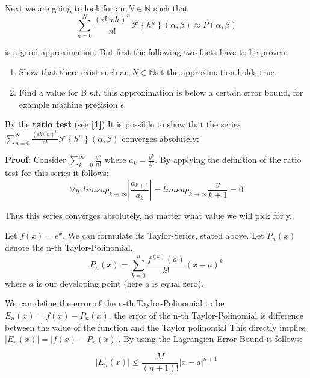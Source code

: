 Next we are going to look for an $N\mathbb{\in N}$ such that 
\begin{equation*}
 \sum_{n=0}^{N}\frac{(ikwh)^{n}}{n!}\mathcal{F}\left\{ h{}^{n}\right\} (\alpha,\beta) \approx P(\alpha,\beta) 
\end{equation*}

is a good approximation. But first the following two facts have to be proven:

\begin{enumerate}
\item Show that there exist such an $N\mathbb{\in N}$s.t the approximation
holds true.
\item Find a value for B s.t. this approximation is below a certain error
bound, for example machine precision $\epsilon$. 
\end{enumerate}


By the \textbf{ratio test} (see \textbf{{[}1{]}}) 
It is possible to show that the series $\sum_{n=0}^{N}\frac{(ikwh)^{n}}{n!}\mathcal{F}\left\{ h{}^{n}\right\} (\alpha,\beta)$ converges absolutely:

\textbf{Proof}: Consider $\sum_{k=0}^{\infty}\frac{y^{n}}{n!}$ where
$a_{k}=\frac{y^{k}}{k!}$. By applying the definition of the ratio test for this series it follows: 
\begin{equation*}
 \forall y:limsup_{k\rightarrow\infty}|\frac{a_{k+1}}{a_{k}}|=limsup_{k\rightarrow\infty}\frac{y}{k+1}=0 
\end{equation*}

Thus this series converges absolutely, no matter what value we will
pick for y.

Let $f(x)=e^{x}$. We can formulate its Taylor-Series, stated above.
Let $P_{n}(x)$denote the n-th Taylor-Polinomial, 
\begin{equation*}
 P_{n}(x)=\sum_{k=0}^{n}\frac{f^{(k)}(a)}{k!}(x-a)^{k}
\end{equation*}
where $a$ is our developing point (here a is equal zero). 

We can define the error of the n-th Taylor-Polinomial to be $E_{n}(x)=f(x)-P_{n}(x)$.
the error of the n-th Taylor-Polinomial is difference between the value of the function and the Taylor polinomial
This directly implies $|E_{n}(x)|=|f(x)-P_{n}(x)|$. By using the Lagrangien Error Bound it follows: 

\begin{equation*}
 |E_{n}(x)|\leq\frac{M}{(n+1)!}|x-a|^{n+1} 
\end{equation*}

